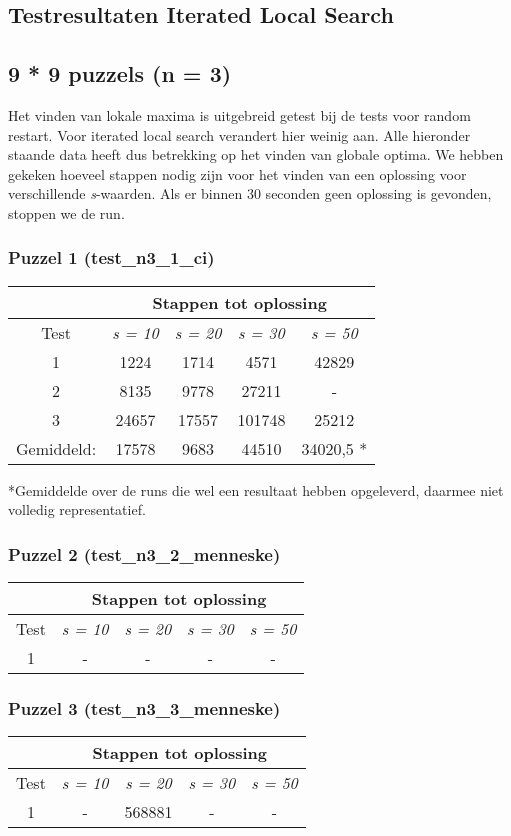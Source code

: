 \documentclass[]{report}
\begin{document}
\begin{appendices}
\chapter{Testresultaten Iterated Local Search}

\section{9 * 9 puzzels (n = 3)}
Het vinden van lokale maxima is uitgebreid getest bij de tests voor random restart. Voor iterated local search verandert hier weinig aan. Alle hieronder staande data heeft dus betrekking op het vinden van globale optima. We hebben gekeken hoeveel stappen nodig zijn voor het vinden van een oplossing voor verschillende \textit{s}-waarden. Als er binnen 30 seconden geen oplossing is gevonden, stoppen we de run.
\subsection{Puzzel 1 (test\_n3\_1\_ci)}
\begin{tabular}{|c|c|c|c|c|}
\hline  &  \multicolumn{4}{|c|}{Stappen tot oplossing} \\ 
\hline Test & \textit{s = 10} & \textit{s = 20} & \textit{s = 30} & \textit{s = 50} \\ 
\hline
\hline 1 & 1224 & 1714 & 4571 & 42829 \\ 
\hline 2 & 8135 & 9778 & 27211 &  - \\ 
\hline 3 & 24657 & 17557 & 101748 &  25212 \\ 
\hline 
\hline Gemiddeld: & 17578 & 9683 & 44510 & 34020,5 * \\ 
\hline 
\end{tabular} 

*Gemiddelde over de runs die wel een resultaat hebben opgeleverd, daarmee niet volledig representatief.
\subsection{Puzzel 2 (test\_n3\_2\_menneske)}
\begin{tabular}{|c|c|c|c|c|}
\hline  &  \multicolumn{4}{|c|}{Stappen tot oplossing} \\ 
\hline Test & \textit{s = 10} & \textit{s = 20} & \textit{s = 30} & \textit{s = 50} \\ 
\hline
\hline 1 & - & - & - & - \\ 
\hline
\end{tabular} 
\subsection{Puzzel 3 (test\_n3\_3\_menneske)}
\begin{tabular}{|c|c|c|c|c|}
\hline  &  \multicolumn{4}{|c|}{Stappen tot oplossing} \\ 
\hline Test & \textit{s = 10} & \textit{s = 20} & \textit{s = 30} & \textit{s = 50} \\ 
\hline
\hline 1 & - & 568881 & - & - \\ 
\hline
\end{tabular} 

\end{appendices}
\end{document}
